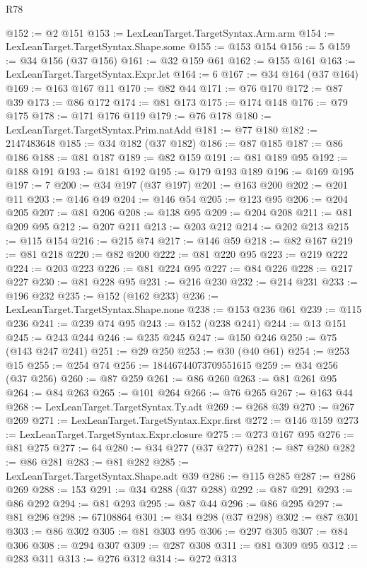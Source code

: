 \begin{lexlean}{R78}
\begin{coremodule}
@152 := @2 @151
@153 := LexLeanTarget.TargetSyntax.Arm.arm
@154 := LexLeanTarget.TargetSyntax.Shape.some
@155 := @153 @154
@156 := 5
@159 := @34 @156 (@37 @156)
@161 := @32 @159 @61
@162 := @155 @161
@163 := LexLeanTarget.TargetSyntax.Expr.let
@164 := 6
@167 := @34 @164 (@37 @164)
@169 := @163 @167 @11
@170 := @82 @44
@171 := @76 @170
@172 := @87 @39
@173 := @86 @172
@174 := @81 @173
@175 := @174 @148
@176 := @79 @175
@178 := @171 @176 @119
@179 := @76 @178
@180 := LexLeanTarget.TargetSyntax.Prim.natAdd
@181 := @77 @180
@182 := 2147483648
@185 := @34 @182 (@37 @182)
@186 := @87 @185
@187 := @86 @186
@188 := @81 @187
@189 := @82 @159
@191 := @81 @189 @95
@192 := @188 @191
@193 := @181 @192
@195 := @179 @193 @189
@196 := @169 @195
@197 := 7
@200 := @34 @197 (@37 @197)
@201 := @163 @200
@202 := @201 @11
@203 := @146 @49
@204 := @146 @54
@205 := @123 @95
@206 := @204 @205
@207 := @81 @206
@208 := @138 @95
@209 := @204 @208
@211 := @81 @209 @95
@212 := @207 @211
@213 := @203 @212
@214 := @202 @213
@215 := @115 @154
@216 := @215 @74
@217 := @146 @59
@218 := @82 @167
@219 := @81 @218
@220 := @82 @200
@222 := @81 @220 @95
@223 := @219 @222
@224 := @203 @223
@226 := @81 @224 @95
@227 := @84 @226
@228 := @217 @227
@230 := @81 @228 @95
@231 := @216 @230
@232 := @214 @231
@233 := @196 @232
@235 := @152 (@162 @233)
@236 := LexLeanTarget.TargetSyntax.Shape.none
@238 := @153 @236 @61
@239 := @115 @236
@241 := @239 @74 @95
@243 := @152 (@238 @241)
@244 := @13 @151
@245 := @243 @244
@246 := @235 @245
@247 := @150 @246
@250 := @75 (@143 @247 @241)
@251 := @29 @250
@253 := @30 (@40 @61)
@254 := @253 @15
@255 := @254 @74
@256 := 18446744073709551615
@259 := @34 @256 (@37 @256)
@260 := @87 @259
@261 := @86 @260
@263 := @81 @261 @95
@264 := @84 @263
@265 := @101 @264
@266 := @76 @265
@267 := @163 @44
@268 := LexLeanTarget.TargetSyntax.Ty.adt
@269 := @268 @39
@270 := @267 @269
@271 := LexLeanTarget.TargetSyntax.Expr.first
@272 := @146 @159
@273 := LexLeanTarget.TargetSyntax.Expr.closure
@275 := @273 @167 @95
@276 := @81 @275
@277 := 64
@280 := @34 @277 (@37 @277)
@281 := @87 @280
@282 := @86 @281
@283 := @81 @282
@285 := LexLeanTarget.TargetSyntax.Shape.adt @39
@286 := @115 @285
@287 := @286 @269
@288 := 153
@291 := @34 @288 (@37 @288)
@292 := @87 @291
@293 := @86 @292
@294 := @81 @293
@295 := @87 @44
@296 := @86 @295
@297 := @81 @296
@298 := 67108864
@301 := @34 @298 (@37 @298)
@302 := @87 @301
@303 := @86 @302
@305 := @81 @303 @95
@306 := @297 @305
@307 := @84 @306
@308 := @294 @307
@309 := @287 @308
@311 := @81 @309 @95
@312 := @283 @311
@313 := @276 @312
@314 := @272 @313

\end{coremodule}
\end{lexlean}
